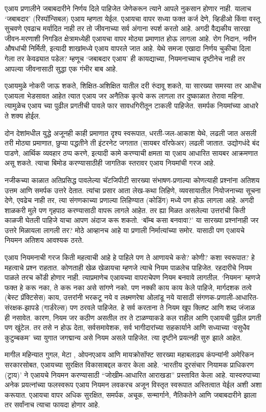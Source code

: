 एआय प्रणालीने जबाबदारीने निर्णय दिले पाहिजेत जेणेकरून त्याने आपले नुकसान होणार नाही. यालाच ‘जबाबदार’ (रिस्पॉन्सिबल) एआय म्हणता येईल. एआयचा वापर सध्या फक्त कर्ज देणे, व्हिडीओ किंवा वस्तू सुचवणे एवढाच मर्यादित नाही तर तो जीवनाच्या सर्व अंगाना स्पर्श करतो आहे. अगदी वैद्यकीय सारखा जीवन-मरणाशी निगडित क्षेत्रामध्येही एआयचा वापर मोठ्या प्रमाणात होऊ लागला आहे. रोग निदान, नवीन औषधांची निर्मिती, इत्यादी शाखांमध्ये एआय वापरले जात आहे. येथे समजा एखादा निर्णय चुकीचा दिला गेला तर केवढ्यात पडेल? म्हणूच ‘जबाबदार एआय’ ही कायद्याच्या, नियमनाच्याच दृष्टीनेच नाही तर आपल्या जीवनासाठी सुद्धा एक गंभीर बाब आहे.

एआयमुळे नोकरी जाऊ शकते, शिक्षित-अशिक्षित यातील दरी रुंदावू शकते, या सारख्या समस्या तर आधीच एआयला भेडसावत आहेत त्यात एआय जर अनैतिक कृत्ये करू लागला तर दुष्काळात तेरावा महिना. त्यामुळेच एआय च्या पुढील प्रगतीची पावले फार सावधगिरीतून टाकली पाहिजेत. समर्पक नियमांच्या आधारे ते शक्य होईल.

दोन देशांमधील युद्धे अजूनही काही प्रमाणात दृश्य स्वरूपात, धरती-जल-आकाश येथे, लढली जात असली तरी मोठ्या प्रमाणात, छुप्या पद्धतीने ती इंटरनेट जगतात (सायबर वॉरफेअर) लढली जातात. उद्योगधंदे बंद पाडणे, आर्थिक व्यवहार ठप्प करणे, इत्यादी कामे करण्याची क्षमता या एआय आधारित सायबर आक्रमणात असू शकते. त्याचा बिमोड करण्यासाठीही जागतिक स्तरावर एआय नियमांची गरज आहे.

नजीकच्या काळात अतिप्रसिद्ध पावलेल्या चॅटजिपीटी सारख्या संभाषण-प्रणाल्या कोणत्याही प्रश्नांना अतिशय उत्तम आणि समर्पक उत्तरे देतात. त्यांचा प्रसार आता लेख-कथा लिहिणे, व्यवसायातील नियोजनाच्या सूचना देणे, एवढेच नाही तर, त्या संगणकाच्या प्रणाल्या लिहिण्यात (कोडिंग) मध्ये पण होऊ लागला आहे. अगदी शाळकरी मुले पण गृहपाठ करण्यासाठी वापरू लागले आहेत. तर ह्या मिळत असलेल्या उत्तरांची किती काळजी घेतली पाहिजे याचा आपण अंदाज करू शकतो. ‘बॉम्ब कसा बनवावा?’ या सारख्या प्रश्नांनाही जर उत्तरे मिळायला लागली तर? मोठे आव्हानच आहे या प्रणाली निर्मात्यांच्या समोर. यासाठी पण एआयचे नियमन अतिशय आवश्यक ठरते.

एआय नियमनाची गरज किती महत्वाची आहे हे पाहिले पण ते आणायचे कसे? कोणी? कशा स्वरूपात? हे महत्वाचे प्रश्न राहतात. कोणताही खेळ खेळायचा म्हणजे त्याचे नियम पाळलेच पाहिजेत. रहदारीचे नियम पाळले तरच कोंडी होणार नाही. त्याप्रमाणेच एआयच्या वापराचेपण नियम बनवावे लागतील. ‘नियमन’ म्हणजे फक्त हे करू नका, ते करू नका असे सांगणे नको. पण नक्की काय काय केले पाहिजे, मार्गदशक तत्वे (बेस्ट प्रॅक्टिसेस) काय, उत्तरांनी भरकटू नये व लक्ष्मणरेषा ओलांडू नये यासाठी संगणक-प्रणाली-आधारित-संरक्षक-झापडे (गार्डरेल्स) पण ठरवले पाहिजेत. हे सर्व करताना ते नियम खूप क्लिष्ट आणि शब्द जंजाळ ही नसावेत. कारण, नियम जर कठीण असतील तर ते टाळण्याकडे कल राहील आणि एआयची पुढील प्रगती पण खुंटेल. तर तसे न होऊ देता, सर्वसमावेशक, सर्व भागीदारांच्या सहकार्याने आणि सध्याच्या ‘वसुधैव कुटुम्बकम’ च्या युगात जगद्मान्य असे नियम असले पाहिजेत. त्या दृष्टीने प्रयत्नही सुरु झाले आहेत.

मागील महिन्यात गुगल, मेटा , ओपनएआय आणि मायक्रोसॉफ्ट सारख्या महाबलाढ्य कंपन्यांनी अमेरिकन सरकारसोबत, एआयच्या सुरक्षित विकासाबद्दल करार केला आहे. ‘भारतीय दूरसंचार नियामक प्राधिकरण (ट्राय)’ ने एआयचे नियमन करण्यासाठी “जोखीम-आधारित आराखडा” प्रस्तावित केला आहे. यास्वरुपाच्या अनेक प्रयत्नांच्या फलस्वरूप एआय नियमन लवकरच अजून विस्तृत स्वरूपात अस्तित्वात येईल अशी अशा करूयात. एआयचा वापर अधिक सुरक्षित, समर्पक, अचूक, सन्मार्गाने, नैतिकतेने आणि जबाबदारीने झाला तर सर्वांनाच त्याचा फायदा होणार आहे.